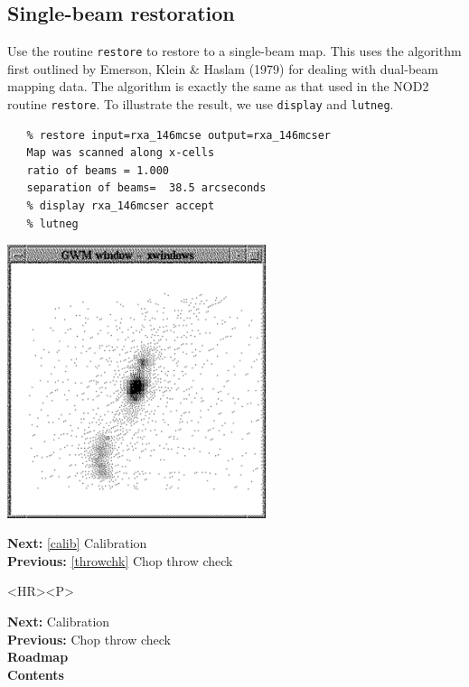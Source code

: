 \documentclass[11pt]{article}
\newcommand{\htmladdimg}[1]{}
\newenvironment{latexonly}{}{}
\newcommand{\htmlref}[2]{#1}
\newcommand{\xref}[3]{#1}
\newcommand{\xlabel}[1]{}
\newcommand{\htmltex}[1]{}
\begin{document}
\subsection{\label{restore}\xlabel{restore}Single-beam restoration}

   Use the routine
{\tt \xref{restore}{sun132}{RESTORE}}
   to restore to a single-beam map. This uses the algorithm first outlined by
\htmltex{\ref{reference}}Emerson, Klein \& Haslam (1979){}
   for dealing with dual-beam mapping data. The algorithm is exactly the
   same as that used in the NOD2 routine {\tt restore}. To illustrate
   the result, we use
{\tt \xref{display}{sun95}{DISPLAY}}
   and
{\tt \xref{lutneg}{sun95}{LUTNEG}}.

\begin{verbatim}
   % restore input=rxa_146mcse output=rxa_146mcser
   Map was scanned along x-cells
   ratio of beams = 1.000
   separation of beams=  38.5 arcseconds
   % display rxa_146mcser accept
   % lutneg
\end{verbatim}

\begin{latexonly}
\begin{center}
\leavevmode\includegraphics[height=80mm]{sc1_display4}
\end{center}
\end{latexonly}
\htmladdimg{addon/display4.gif}

\begin{latexonly}
{\bf Next:} \ref{calib} Calibration\\
{\bf Previous:} \ref{throwchk} Chop throw check\\
\end{latexonly}

\begin{htmlonly}
\begin{rawhtml} <HR><P> \end{rawhtml}
{\bf \htmlref{Next:}{calib}} Calibration\\
{\bf \htmlref{Previous:}{throwchk}} Chop throw check\\
{\bf \htmlref{Roadmap}{roadmap}}\\
{\bf \htmlref{Contents}{stardoccontents}}\\
\end{htmlonly}
\end{document}
